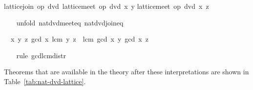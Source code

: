 \begin{isabellebody}
\begin{isamarkuptxt}
\begin{isabelle}
lattice{\isachardot}join\ op\ dvd\ {\isacharparenleft}lattice{\isachardot}meet\ op\ dvd\ x\ y{\isacharparenright}\isanewline
{}lattice{\isachardot}meet\ op\ dvd\ x\ z{\isacharparenright}%
\end{isabelle}%
\end{isamarkuptxt}%
\isamarkuptrue%
\ \ \isamarkupfalse%
\ {\isacharparenleft}unfold\ nat{\isacharunderscore}dvd{\isacharunderscore}meet{\isacharunderscore}eq\ nat{\isacharunderscore}dvd{\isacharunderscore}join{\isacharunderscore}eq{\isacharparenright}%
\begin{isamarkuptxt}%
\begin{isabelle}%
\ {}{\isachardot}\ {\isasymAnd}x\ y\ z{\isachardot}\ gcd\ x\ {\isacharparenleft}lcm\ y\ z{\isacharparenright}\ {\isacharequal}\ lcm\ {\isacharparenleft}gcd\ x\ y{\isacharparenright}\ {\isacharparenleft}gcd\ x\ z{\isacharparenright}%
\end{isabelle}%
\end{isamarkuptxt}%
\isamarkuptrue%
\ \ \isamarkupfalse%
\ {\isacharparenleft}rule\ gcd{\isacharunderscore}lcm{\isacharunderscore}distr{\isacharparenright}\ \isamarkupfalse%
%
\endisatagvisible
{\isafoldvisible}%
%
\isadelimvisible
%
\endisadelimvisible
%
\begin{isamarkuptext}%
Theorems that are available in the theory after these
  interpretations are shown in Table~\ref{tab:nat-dvd-lattice}.


\end{isamarkuptext}
\end{isabellebody}
